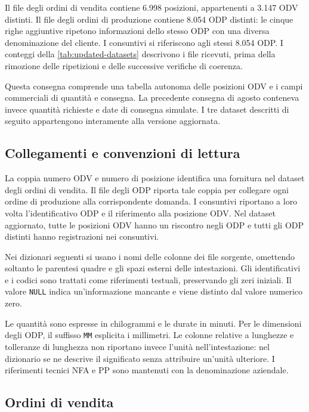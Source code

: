 Il file degli ordini di vendita contiene 6.998 posizioni, appartenenti a 3.147 ODV distinti. Il file degli ordini di produzione contiene 8.054 ODP distinti: le cinque righe aggiuntive ripetono informazioni dello stesso ODP con una diversa denominazione del cliente. I consuntivi si riferiscono agli stessi 8.054 ODP. I conteggi della \cref{tab:updated-datasets} descrivono i file ricevuti, prima della rimozione delle ripetizioni e delle successive verifiche di coerenza.

Questa consegna comprende una tabella autonoma delle posizioni ODV e i campi commerciali di quantità e consegna. La precedente consegna di agosto conteneva invece quantità richieste e date di consegna simulate. I tre dataset descritti di seguito appartengono interamente alla versione aggiornata.

\subsection{Collegamenti e convenzioni di lettura}
\label{sec:dataset-links}

La coppia numero ODV e numero di posizione identifica una fornitura nel dataset degli ordini di vendita. Il file degli ODP riporta tale coppia per collegare ogni ordine di produzione alla corrispondente domanda. I consuntivi riportano a loro volta l'identificativo ODP e il riferimento alla posizione ODV. Nel dataset aggiornato, tutte le posizioni ODV hanno un riscontro negli ODP e tutti gli ODP distinti hanno registrazioni nei consuntivi.

Nei dizionari seguenti si usano i nomi delle colonne dei file sorgente, omettendo soltanto le parentesi quadre e gli spazi esterni delle intestazioni. Gli identificativi e i codici sono trattati come riferimenti testuali, preservando gli zeri iniziali. Il valore \texttt{NULL} indica un'informazione mancante e viene distinto dal valore numerico zero.

Le quantità sono espresse in chilogrammi e le durate in minuti. Per le dimensioni degli ODP, il suffisso \texttt{MM} esplicita i millimetri. Le colonne relative a lunghezze e tolleranze di lunghezza non riportano invece l'unità nell'intestazione: nel dizionario se ne descrive il significato senza attribuire un'unità ulteriore. I riferimenti tecnici NFA e PP sono mantenuti con la denominazione aziendale.

\subsection{Ordini di vendita}
\label{sec:sales-order-data}

